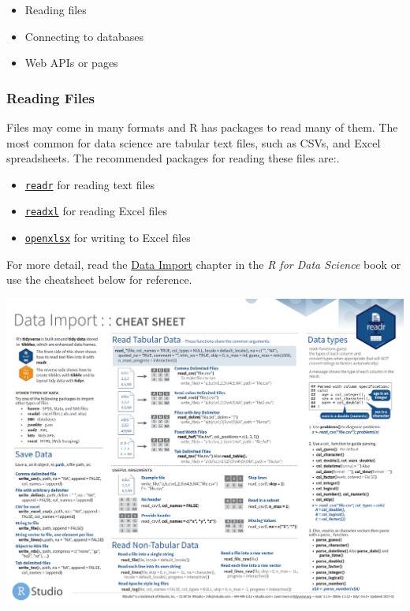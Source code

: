 \documentclass[]{book}
\providecommand{\tightlist}{%
  \setlength{\itemsep}{0pt}\setlength{\parskip}{0pt}}
\begin{document}
\begin{itemize}
\tightlist
\item
  Reading files
\item
  Connecting to databases
\item
  Web APIs or pages
\end{itemize}

\hypertarget{reading-files}{%
\subsubsection{Reading Files}\label{reading-files}}

Files may come in many formats and R has packages to read many of them. The most common
for data science are tabular text files, such as CSVs, and Excel spreadsheets. The
recommended packages for reading these files are:.

\begin{itemize}
\tightlist
\item
  \href{http://readr.tidyverse.org/}{\texttt{readr}} for reading text files
\item
  \href{http://readxl.tidyverse.org/}{\texttt{readxl}} for reading Excel files
\item
  \href{https://www.rdocumentation.org/packages/openxlsx/}{\texttt{openxlsx}} for writing to Excel
  files
\end{itemize}

For more detail, read the \href{https://r4ds.had.co.nz/data-import.html}{Data Import} chapter in
the \emph{R for Data Science} book or use the cheatsheet below for reference.

\href{https://github.com/rstudio/cheatsheets/raw/master/data-import.pdf}{\includegraphics{images/data-import.png}}
\end{document}
